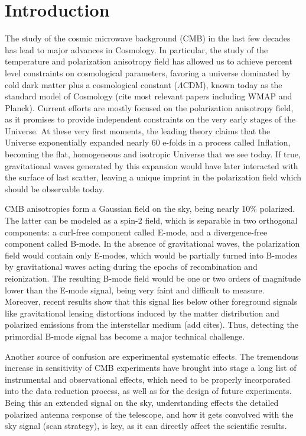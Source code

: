 \documentclass[a4paper,fleqn]{cas-dc}\sloppy
\begin{document}
	\section{Introduction}
	
	The study of the cosmic microwave background (CMB) in the last few decades has lead to major advances in Cosmology. In particular, the study of the temperature and polarization anisotropy field has allowed us to achieve percent level constraints on cosmological parameters, favoring a universe dominated by cold dark matter plus a cosmological constant ($\Lambda$CDM), known today as the standard model of Cosmology {\color{red} (cite most relevant papers including WMAP and Planck)}. Current efforts are mostly focused on the polarization anisotropy field, as it promises to provide independent constraints on the very early stages of the Universe. At these very first moments, the leading theory claims that the Universe exponentially expanded nearly 60 e-folds in a process called Inflation, becoming the flat, homogeneous and isotropic Universe that we see today. If true, gravitational waves generated by this expansion would have later interacted with the surface of last scatter, leaving a unique imprint in the polarization field which should be observable today.
	
	CMB anisotropies form a Gaussian field on the sky, being nearly 10\% polarized. The latter can be modeled as a spin-2 field, which is separable in two orthogonal components: a curl-free component called E-mode, and a divergence-free component called B-mode. In the absence of gravitational waves, the polarization field would contain only E-modes, which would be partially turned into B-modes by gravitational waves acting during the epochs of recombination and reionization. The resulting B-mode field would be one or two orders of magnitude lower than the E-mode signal, being very faint and difficult to measure. Moreover, recent results show that this signal lies below other foreground signals like gravitational lensing distortions induced by the matter distribution and polarized emissions from the interstellar medium {\color{red}(add cites)}. Thus, detecting the primordial B-mode signal has become a major technical challenge.
	
	Another source of confusion are experimental systematic effects. The tremendous increase in sensitivity of CMB experiments have brought into stage a long list of instrumental and observational effects, which need to be properly incorporated into the data reduction process, as well as for the design of future experiments. Being this an extended signal on the sky, understanding effects the detailed polarized antenna response of the telescope, and how it gets convolved with the sky signal (scan strategy), is key, as it can directly affect the scientific results.
	
\end{document}
